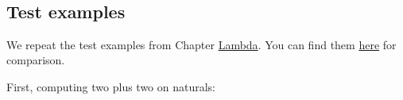 \begin{fence}
\begin{code}%
\>[0]\AgdaFunction{\AgdaUnderscore{}}\AgdaSpace{}%
\AgdaSymbol{:}\AgdaSpace{}%
\AgdaSpace{}%
\AgdaSpace{}%
\AgdaSymbol{(}\AgdaSpace{}%
\AgdaSpace{}%
\AgdaSymbol{)}\AgdaSpace{}%
\AgdaSpace{}%
\AgdaSpace{}%
\AgdaSpace{}%
\<%
\\
\>[0]\AgdaSymbol{\AgdaUnderscore{}}\AgdaSpace{}%
\AgdaSymbol{=}\AgdaSpace{}%
\AgdaSpace{}%
\AgdaSpace{}%
\AgdaSymbol{(}\AgdaOperator{\AgdaFunction{\#}}\AgdaSpace{}%
\AgdaSpace{}%
\AgdaSpace{}%
\AgdaSymbol{(}\AgdaOperator{\AgdaFunction{\#}}\AgdaSpace{}%
\AgdaSpace{}%
\AgdaSpace{}%
\AgdaOperator{\AgdaFunction{\#}}\AgdaSpace{}%
\AgdaSymbol{))}\<%
\end{code}
\end{fence}

\hypertarget{test-examples}{%
\subsection{Test examples}\label{test-examples}}

We repeat the test examples from Chapter
\protect\hyperlink{Lambda}{Lambda}. You can find them
\protect\hyperlink{Lambda-derivation}{here} for comparison.

First, computing two plus two on naturals:

